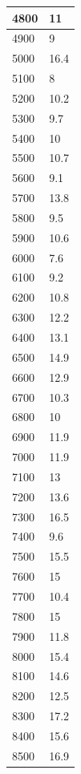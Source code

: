 \begin{center}
\begin{tabularx}{\textwidth}{|X|X|}
        4800 & 11 \\ \hline
        4900 & 9 \\ \hline
        5000 & 16.4 \\ \hline
        5100 & 8 \\ \hline
        5200 & 10.2 \\ \hline
        5300 & 9.7 \\ \hline
        5400 & 10 \\ \hline
        5500 & 10.7 \\ \hline
        5600 & 9.1 \\ \hline
        5700 & 13.8 \\ \hline
        5800 & 9.5 \\ \hline
        5900 & 10.6 \\ \hline
        6000 & 7.6 \\ \hline
        6100 & 9.2 \\ \hline
        6200 & 10.8 \\ \hline
        6300 & 12.2 \\ \hline
        6400 & 13.1 \\ \hline
        6500 & 14.9 \\ \hline
        6600 & 12.9 \\ \hline
        6700 & 10.3 \\ \hline
        6800 & 10 \\ \hline
        6900 & 11.9 \\ \hline
        7000 & 11.9 \\ \hline
        7100 & 13 \\ \hline
        7200 & 13.6 \\ \hline
        7300 & 16.5 \\ \hline
        7400 & 9.6 \\ \hline
        7500 & 15.5 \\ \hline
        7600 & 15 \\ \hline
        7700 & 10.4 \\ \hline
        7800 & 15 \\ \hline
        7900 & 11.8 \\ \hline
        8000 & 15.4 \\ \hline
        8100 & 14.6 \\ \hline
        8200 & 12.5 \\ \hline
        8300 & 17.2 \\ \hline
        8400 & 15.6 \\ \hline
        8500 & 16.9 \\ \hline

\end{tabularx}
\end{center}
